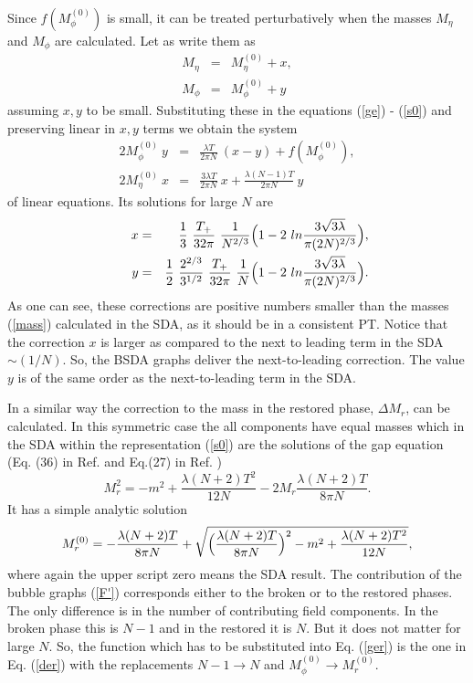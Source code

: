 \documentclass[a4paper,12pt]{article}
\begin{document}
Since $ f(M^{(0)}_{\phi})$ is small, it can be treated perturbatively
when the masses $M_{\eta}$ and $ M_{\phi}$ are calculated. Let as
write them as
\begin{eqnarray} \label{mass1}
M_{\eta} &=& M_{\eta}^{(0)} + x, \\ \nonumber
M_{\phi} &=& M_{\phi}^{(0)} + y 
\end{eqnarray}
assuming $x, y$ to be small. Substituting these in the  equations
(\ref{ge}) - (\ref{s0}) and preserving linear in $x, y$ terms we
obtain the system 
\begin{eqnarray} \label{ge1}
2 M_{\phi}^{(0)}~ y &=& \frac{\lambda T}{2 \pi N}~ (x - y) +
f(M_{\phi}^{(0)}),\\ \nonumber
2 M_{\eta}^{(0)}~ x &=& \frac{3 \lambda T}{2 \pi N}~ x + \frac{\lambda (N
  - 1) T}{2 \pi N}~ y
\end{eqnarray}
of linear equations. Its solutions for large $N$ are
\begin{eqnarray} \label{mass2}
~~~~~~x &=& \frac{1}{3}~ \frac{T_+}{32 \pi}~\frac{1}{ N^{2/3}}\Bigl (
1 - 2~ ln \frac{3 \sqrt{3\lambda} }{\pi (2N)^{2/3}}\Bigr) , \\
\nonumber ~~~~~~y &=& \frac{1}{2}~ \frac{2^{2/3}}{3^{1/2}}~
\frac{T_+}{32 \pi}~\frac{1}{ N}\Bigl ( 1 - 2~ ln \frac{3
\sqrt{3\lambda} }{\pi (2N)^{2/3}}\Bigr) .
\end{eqnarray}
As one can see, these corrections are positive numbers smaller than
the masses (\ref{mass}) calculated in the SDA, as it should be in a
consistent PT. Notice that the correction $x$ is larger as compared to
the next to leading term in the SDA $\sim (1/N)$.  So, the BSDA graphs
deliver the next-to-leading correction. The value $y$ is of the same
order as the next-to-leading term in the SDA.

In a similar way the correction to the mass in the restored phase,
$\Delta M_r$, can be calculated. In this symmetric case the all
components have equal masses which in the SDA
within the representation (\ref{s0}) are the solutions of the gap
equation (Eq. (36) in Ref.\cite{prd} and Eq.(27) in Ref. \cite{pl})
\begin{equation} \label{ger}
M_r^2 =  - m^2 + \frac{\lambda (N + 2) T^2}{12 N} - 2 M_r \frac{\lambda
  (N + 2) T}{8 \pi N}.
\end{equation}
It has a simple analytic solution
\begin{equation} \label{mr}
M_r^{(0)} = - \frac{\lambda (N + 2)T}{8 \pi N} + \sqrt{\Bigl(\frac{\lambda
    (N + 2)T}{8 \pi N}\Bigr)^2 - m^2 + \frac{\lambda (N + 2)T^2}{12 N}},
\end{equation}
where again the upper script zero means the SDA result. The
contribution of the bubble graphs (\ref{F'}) corresponds either to the
broken or to the restored phases. The only difference is in the number
of contributing field components. In the broken phase this is $N -1$
and in the restored it is $N$. But it does not matter for large $N$.
So, the function which has to be substituted into Eq. (\ref{ger}) is
the one in Eq. (\ref{der}) with the replacements $N - 1 \to N$ and
$M^{(0)}_{\phi} \to M^{(0)}_{r}$.
\end{document}
